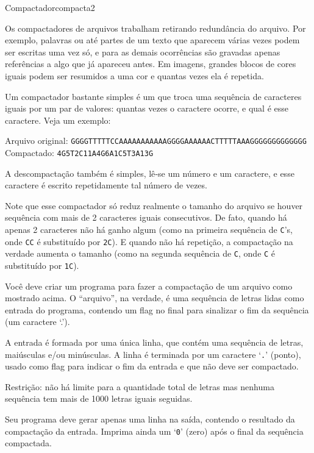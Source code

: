 \documentclass[12pt,a4paper,oneside]{article}
\begin{document}
\begin{problem}{Compactador}{compacta}{2}

Os compactadores de arquivos trabalham retirando redundância do arquivo. Por exemplo, palavras ou até partes de um texto que aparecem várias vezes podem ser escritas uma vez só, e para as demais ocorrências são gravadas apenas referências a algo que já apareceu antes. Em imagens, grandes blocos de cores iguais podem ser resumidos a uma cor e quantas vezes ela é repetida.

Um compactador bastante simples é um que troca uma sequência de caracteres iguais por um par de valores: quantas vezes o caractere ocorre, e qual é esse caractere. Veja um exemplo:

Arquivo original: \texttt{GGGGTTTTTCCAAAAAAAAAAAGGGGAAAAAACTTTTTAAAGGGGGGGGGGGGG}\\[0pt]
Compactado: \texttt{4G5T2C11A4G6A1C5T3A13G}

A descompactação também é simples, lê‐se um número e um caractere, e esse caractere é escrito repetidamente tal número de vezes.

Note que esse compactador só reduz realmente o tamanho do arquivo se houver sequência com mais de 2 caracteres iguais consecutivos. De fato, quando há apenas 2 caracteres não há ganho algum (como na primeira sequência de \texttt{C}’s, onde \texttt{CC} é substituído por \texttt{2C}). E quando não há repetição, a compactação na verdade aumenta o tamanho (como na segunda sequência de \texttt{C}, onde \texttt{C} é substituído por \texttt{1C}).

Você deve criar um programa para fazer a compactação de um arquivo como mostrado acima. O ``arquivo'', na verdade, é uma sequência de letras lidas como entrada do programa, contendo um flag no final para sinalizar o fim da sequência (um caractere ‘.’). 

%

\InputFile

A entrada é formada por uma única linha, que contém uma sequência de letras, maiúsculas e/ou minúsculas. A linha é terminada por um caractere `\texttt{.}' (ponto), usado como flag para indicar o fim da entrada e que não deve ser compactado.

Restrição: não há limite para a quantidade total de letras mas nenhuma sequência tem mais de 1000 letras iguais seguidas.


\OutputFile

Seu programa deve gerar apenas uma linha na saída, contendo o resultado da compactação da entrada. Imprima ainda um `\texttt{0}' (zero) após o final da sequência compactada.


\end{problem}
\end{document}

